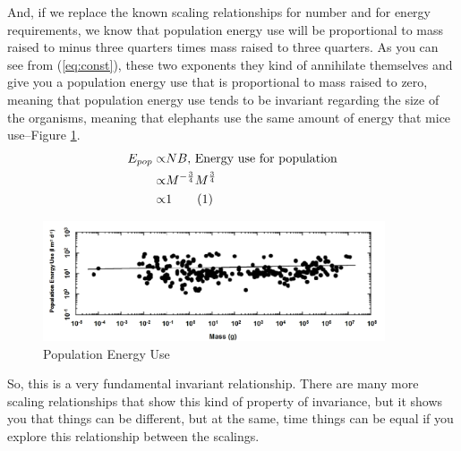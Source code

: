 \documentclass[]{article}
\newcommand\numberthis{\addtocounter{equation}{1}\tag{\theequation}}
\begin{document}
And, if we replace the known
scaling relationships
for number and for energy requirements,
we know that population energy use
will be proportional to
mass raised to minus three quarters
times mass raised to three quarters.
As you can see from (\ref{eq:const}), these two exponents
they kind of annihilate themselves
and give you a population energy use
that is proportional to
mass raised to zero,
meaning that population energy use
tends to be invariant
regarding the size of the organisms,
meaning that elephants use
the same amount of energy
that mice use--Figure \ref{fig:PopulationEnergyUse}.
\begin{align*}
	E_{pop}\propto&N B\text{, Energy use for population}\\
	\propto& M^{-\frac{3}{4}} M^{\frac{3}{4}}\\
	\propto& 1\label{eq:const}\numberthis
\end{align*}
\begin{figure}[H]
	\caption[Population Energy Use]{Population Energy Use\cite{enquist1998allometric} }\label{fig:PopulationEnergyUse}
	\includegraphics[width=0.9\textwidth]{PopulationEnergyUse}
\end{figure}

So, this is a very fundamental
invariant relationship.
There are many more scaling relationships
that show this kind of property
of invariance,
but it shows you that
things can be different,
but at the same,
time things can be equal
if you explore this relationship
between the scalings.
\end{document}
